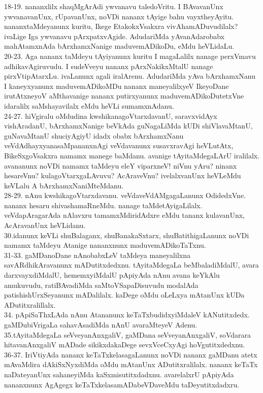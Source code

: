 \documentclass{article}
\begin{document}
18-19. nananxlilx shaqMgArAdi ywvanavu taledoVritu. I BAvavanUnx ywvanavanUnx, rUpavanUnx, noVDi nananx tAyige bahu vayxtheyAyitu. nananxtaMdeyanunx kuritu, Ikege EtakokxVsakxra vivAhamADuvudilalx? ivaLige Iga ywvanavu pArxpatxvAgide. AdudariMda yAvanAdarobabx mahAtamxnAda bArxhamxNanige maduvemADikoDu, eMdu heVLidaLu.\\
20-23. Aga nananx taMdeyu tAyiyanunx kuritu I magaLalilx nanage perxVmavu adhikavAgiruvudu. I sudeVveyu nananx pArxNakikxMtalU nanage pirxVtipAtarxLu. ivaLanunx agali iralArenu. AdudariMda yAva bArxhamxNanu I kaneyxyanunx maduvemADikoMDu nananx maneyalilxyeV IkeyoDane irutAtxneyoV aMthavanige nananx putirxyanunx maduvemADikoDutetxVne idaralilx saMshayavilalx eMdu heVLi sumamxnAdanu.\\
24-27. hiVgiralu oMdudina kwshikanagoVtarxdavanU, saravxvidAyx vishAradanU, bArxhamxNanige beVkAda guNagaLiMda kUDi shiVlavaMtanU, guNavaMtanU shuciyAgiyU idadx obabx bArxhamxNanu veVdAdhayxyanasaMpananxnAgi veVdavanunx susavxravAgi heVLutAtx, BikeSxgoVsakxra namamx manege baMdanu. avanige tAyitaMdegaLArU iralilalx. avananunx noVDi namamx taMdeyu eleY viparxneV! niVnu yAru? ninanx hesareVnu? kulagoVtarxgaLAvuvu? AcAraveVnu? ivelalxvanUnx heVLeMdu keVLalu A bArxhamxNaniMteMdanu.\\
28-29. nAnu kwshikagoVtarxdavanu. veVdaveVdAMgagaLanunx OdidedxVne. nananx hesaru shivashamaRneMdu. nanage taMdetAyigaLilalx. veVdapAragarAda nAlavxru tamamxMdiridAdxre eMdu tananx kulavanUnx, AcAravanUnx heVLidanu.\\
30.idanunx keVLi shuBalaganx, shuBanakaSxtarx, shuBatithigaLanunx noVDi namamx taMdeyu Atanige nananxnunx maduvemADikoTaTxnu.\\
31-33. gaMDanoDane nAnobabxLeV taMdeya maneyalilxna savARdhikAravanunx mADutitxdedxnu. tAyitaMdegaLa beMbaladiMdalU, avara darxvayxdiMdalU, hememxyiMdalU pApiyAda nAnu avana keYkAlu amukuvudu, ratiBAvadiMda saMtoVSapaDisuvudu modalAda patishishUrxSeyanunx mADalilalx. kaDege oMdu oLeLxya mAtanUnx kUDa ADutitxralillalx.\\
34. pApiSaThxLAda nAnu Atananunx keTaTxbudidxyiMdaleV kANutitxdedx. gaMDubiVrigaLa sahavAsadiMda nAnU avaraMteyeV Adenu.\\
35.tAyitaMdegaLa seVveyanAnxgaliV, gaMDana seVveyanAnxgaliV, soVdarara hitavanAnxgaliV mADade sikikxdakaDege sevxVceCxyAgi hoVgutitxdedxnu.\\
36-37. IriVtiyAda nananx keTaTxkelasagaLanunx noVDi nananx gaMDanu atetx mAvaMdira dAkiSxNyxdiMda oMdu mAtanUnx ADutitxralilalx. nananx keTaTx naDateyanUnx sahaneyiMda kaSxmisutitxdadxnu. avarelalxrU pApiyAda nananxnunx AgAgegx keTaTxkelasamADabeVDaveMdu taDeyutitxdadxru.\\
\end{document}
